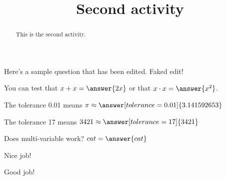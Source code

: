 \documentclass[handout]{ximera}
\title{Second activity}
\begin{document}
\begin{abstract}
This is the second activity.
\end{abstract}


\maketitle

Here's a sample question that has been edited. Faked edit!

\begin{problem}
\begin{multipleChoice}
\end{multipleChoice}
\begin{problem}
   You can test that $x + x = \answer{2x}$ or that $x \cdot x = \answer{x^2}$.

\begin{problem}
   The tolerance 0.01 means $\pi \approx \answer[tolerance=0.01]{3.141592653}$

\begin{problem}
   The tolerance 17 means $3421 \approx \answer[tolerance=17]{3421}$

\begin{problem}
Does multi-variable work? $ cat = \answer{cat}$
\begin{feedback}Nice job!\end{feedback}
\end{problem}
\begin{feedback}Good job!\end{feedback}

\end{problem}
\end{problem}
\end{problem}
\end{problem}
\end{document}
